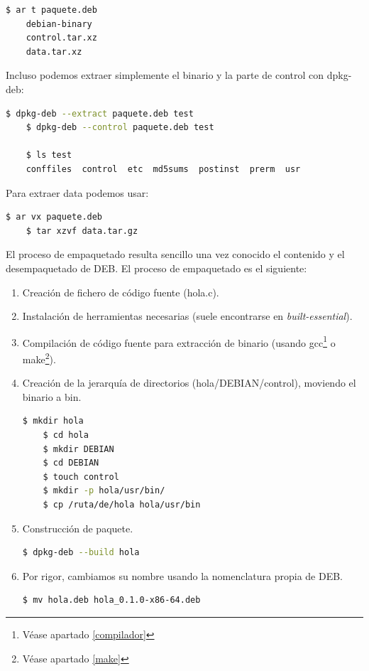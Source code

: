 \documentclass[a4paper, 11pt, titlepage]{article}
\begin{document}
            \begin{lstlisting}[language=bash]
    $ ar t paquete.deb
    debian-binary
    control.tar.xz
    data.tar.xz\end{lstlisting}

            Incluso podemos extraer simplemente el binario y la parte de control con dpkg-deb:

            \begin{lstlisting}[language=bash]
    $ dpkg-deb --extract paquete.deb test
    $ dpkg-deb --control paquete.deb test
    
    $ ls test
    conffiles  control  etc  md5sums  postinst  prerm  usr\end{lstlisting}

            Para extraer data podemos usar:

            \begin{lstlisting}[language=bash]
    $ ar vx paquete.deb
    $ tar xzvf data.tar.gz\end{lstlisting}

            El proceso de empaquetado resulta sencillo una vez conocido el contenido y el desempaquetado 
            de DEB. El proceso de empaquetado es el siguiente:

            \begin{enumerate}
                \item Creación de fichero de código fuente (hola.c).
                \item Instalación de herramientas necesarias (suele encontrarse en \textit{built-essential}).
                \item Compilación de código fuente para extracción de binario (usando gcc\footnote{Véase apartado 
                \ref{compilador}} o make\footnote{Véase apartado \ref{make}}).
                \item Creación de la jerarquía de directorios (hola/DEBIAN/control), moviendo el binario a bin.
                
                \begin{lstlisting}[language=bash]
    $ mkdir hola
    $ cd hola
    $ mkdir DEBIAN
    $ cd DEBIAN
    $ touch control
    $ mkdir -p hola/usr/bin/
    $ cp /ruta/de/hola hola/usr/bin\end{lstlisting}

                \item Construcción de paquete.
                
                \begin{lstlisting}[language=bash]
    $ dpkg-deb --build hola\end{lstlisting}
                
                \item Por rigor, cambiamos su nombre usando la nomenclatura propia de DEB.
                
                \begin{lstlisting}[language=bash]
    $ mv hola.deb hola_0.1.0-x86-64.deb\end{lstlisting}

            \end{enumerate}
\end{document}
